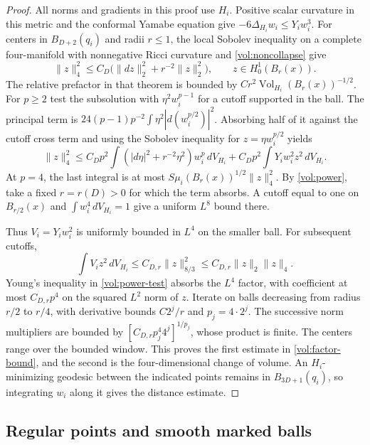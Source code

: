 \begin{proof}
All norms and gradients in this proof use \(H_i\).
Positive scalar curvature in this metric and the conformal
Yamabe equation give
\(-6\Delta_{H_i}w_i\leq Y_i w_i^3\).
For centers in \(B_{D+2}(q_i)\) and radii \(r\leq1\), the local
Sobolev inequality on a complete four-manifold with nonnegative
Ricci curvature \cite[Theorem 3.1]{SaloffCoste1992Uniformly}
and \eqref{vol:noncollapse} give
\[
 \|z\|_4^2\leq C_D\bigl(\|dz\|_2^2+r^{-2}\|z\|_2^2\bigr),
 \qquad z\in H_0^1(B_r(x)).
\]
The relative prefactor in that theorem is bounded by
\(C r^2\operatorname{Vol}_{H_i}(B_r(x))^{-1/2}\).
For \(p\geq2\) test the subsolution with \(\eta^2w_i^{p-1}\)
for a cutoff supported in the ball. The principal term is
\(24(p-1)p^{-2}\int\eta^2|d(w_i^{p/2})|^2\). Absorbing half of
it against the cutoff cross term and using the Sobolev inequality
for \(z=\eta w_i^{p/2}\) yields
\begin{equation}
 \|z\|_4^2\leq C_Dp^2\int (|d\eta|^2+r^{-2}\eta^2)w_i^p\,dV_{H_i}
       +C_Dp^2\int Y_i w_i^2z^2\,dV_{H_i}.
 \label{vol:power-test}
\end{equation}
At \(p=4\), the last integral is at most
\(S\mu_i(B_r(x))^{1/2}\|z\|_4^2\). By \eqref{vol:power}, take a
fixed \(r=r(D)>0\) for which the term absorbs. A cutoff equal to
one on \(B_{r/2}(x)\) and \(\int w_i^4\,dV_{H_i}=1\) give a
uniform \(L^8\) bound there.

Thus \(V_i=Y_iw_i^2\) is uniformly bounded in \(L^4\) on the
smaller ball. For subsequent cutoffs,
\[
 \int V_i z^2\,dV_{H_i}\leq C_{D,r}\|z\|_{8/3}^2
       \leq C_{D,r}\|z\|_2\|z\|_4 .
\]
Young's inequality in \eqref{vol:power-test} absorbs the \(L^4\)
factor, with coefficient at most \(C_{D,r}p^4\) on the squared
\(L^2\) norm of \(z\). Iterate on balls decreasing from radius
\(r/2\) to \(r/4\), with derivative bounds \(C2^j/r\) and
\(p_j=4\cdot 2^j\). The successive norm multipliers are bounded by
\([C_{D,r}p_j^4 4^j]^{1/p_j}\), whose product is finite. The
centers range over the bounded window. This proves the first
estimate in \eqref{vol:factor-bound}, and the second is the
four-dimensional change of volume. An \(H_i\)-minimizing geodesic
between the indicated points remains in \(B_{3D+1}(q_i)\), so
integrating \(w_i\) along it gives the distance estimate.
\end{proof}

\subsection{Regular points and smooth marked balls}

